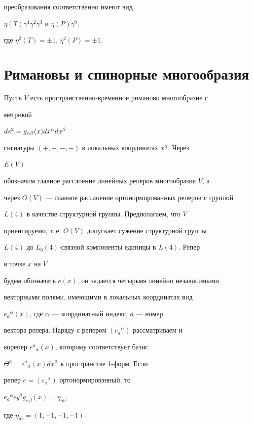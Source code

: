 преобразования соответственно имеют вид


$\eta(T)\gamma^{1}\gamma^{2}\gamma^{3}$ и $\eta(P)\gamma^{0}$,


где $\eta^2(T)=\pm1$, $\eta^2(P)=\pm1$.





\section{Римановы и спинорные многообразия}





Пусть $V$ есть пространственно-временное риманово многообразие с


метрикой


$ds^2=\linebreak g_{\alpha\beta}(x)dx^{\alpha}dx^{\beta}$


сигнатуры $(+,-,-,-)$ в локальных координатах $x^\alpha$. Через


$E(V)$


обозначим главное расслоение линейных реперов многообразия $V$, а


через $O(V)$ --- главное расслоение ортонормированных реперов с группой


$L(4)$ в качестве структурной группы. Предполагаем, что $V$


ориентируемо, т.\,е. $O(V)$ допускает сужение структурной группы


$L(4)$ до $L_{0}(4)$-связной компоненты единицы в $L(4)$. Репер


в точке $x$ на $ V$


будем обозначать $e(x)$, он задается четырьмя линейно независимыми


векторными полями, имеющими в локальных координатах вид


$e_a{}^\alpha(x)$, где $\alpha$ --- координатный индекс, $a$ --- номер


вектора репера. Наряду с репером $(e_a{}^\alpha)$ рассматриваем и


корепер $e^a{}_\alpha(x)$, которому соответствует базис


$\Theta^a=e^a{}_\alpha(x){dx}^\alpha$ в пространстве 1-форм. Если


репер $e=(e_a{}^\alpha )$ ортонормированный, то


$e_a{}^\alpha e_b{}^\beta g_{\alpha \beta}(x)=\eta_{ab}$,


где $\eta_{ab}=(1,-1,-1,-1)$.


